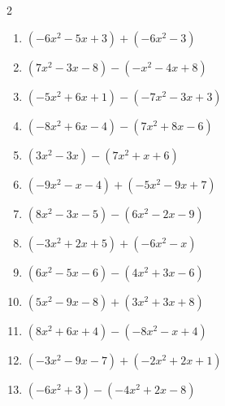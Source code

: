 \begin{multicols}{2}
\begin{enumerate}
        \phantom{$=-5x+8$}

\columnbreak %

  \item $(-6x^{2}-5x+3)+(-6x^{2}-3)$


  \item $(7x^{2}-3x-8)-(-x^{2}-4x+8)$


  \item $(-5x^{2}+6x+1)-(-7x^{2}-3x+3)$


  \item $(-8x^{2}+6x-4)-(7x^{2}+8x-6)$


  \item $(3x^{2}-3x)-(7x^{2}+x+6)$


  \item $(-9x^{2}-x-4)+(-5x^{2}-9x+7)$


  \item $(8x^{2}-3x-5)-(6x^{2}-2x-9)$


  \item $(-3x^{2}+2x+5)+(-6x^{2}-x)$


  \item $(6x^{2}-5x-6)-(4x^{2}+3x-6)$


  \item $(5x^{2}-9x-8)+(3x^{2}+3x+8)$


  \item $(8x^{2}+6x+4)-(-8x^{2}-x+4)$


  \item $(-3x^{2}-9x-7)+(-2x^{2}+2x+1)$


  \item $(-6x^{2}+3)-(-4x^{2}+2x-8)$



\end{enumerate}
\end{multicols}
